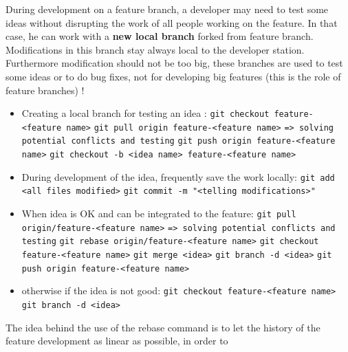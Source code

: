 \documentclass[12pt,a4paper]{article}
\begin{document}
During development on a feature branch, a developer may need to test some ideas without disrupting the work of all people working on the feature. In that case, he can work with a \textbf{new local branch} forked from feature branch. Modifications in this branch stay always local to the developer station. Furthermore modification should not be too big, these branches are used to test some ideas or to do bug fixes, not for developing big features (this is the role of feature branches) !
\begin{itemize}
\item Creating a local branch for testing an idea :
\linebreak \verb|git checkout feature-<feature name>|
\linebreak \verb|git pull origin feature-<feature name>|
\linebreak \verb|=> solving potential conflicts and testing|
\linebreak \verb|git push origin feature-<feature name>|
\linebreak \verb|git checkout -b <idea name> feature-<feature name>|
\item During development of the idea, frequently save the work locally:
\linebreak \verb|git add <all files modified>|
\linebreak \verb|git commit -m "<telling modifications>"|
\item When idea is OK and can be integrated to the feature:
\linebreak \verb|git pull origin/feature-<feature name>|
\linebreak \verb|=> solving potential conflicts and testing|
\linebreak \verb|git rebase origin/feature-<feature name>|
\linebreak \verb|git checkout feature-<feature name>|
\linebreak \verb|git merge <idea>|
\linebreak \verb|git branch -d <idea>|
\linebreak \verb|git push origin feature-<feature name>|
\item otherwise if the idea is not good:
\linebreak \verb|git checkout feature-<feature name>|
\linebreak \verb|git branch -d <idea>|
\end{itemize}

The idea behind the use of the rebase command is to let the history of the feature development as linear as possible, in order to 
\end{document}
